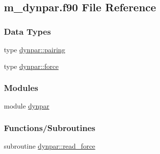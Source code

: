 \hypertarget{m__dynpar_8f90}{}\subsection{m\+\_\+dynpar.\+f90 File Reference}
\label{m__dynpar_8f90}
\subsubsection*{Data Types}
\begin{DoxyCompactItemize}
\item 
type \hyperlink{structdynpar_1_1pairing}{dynpar\+::pairing}
\item 
type \hyperlink{structdynpar_1_1force}{dynpar\+::force}
\end{DoxyCompactItemize}
\subsubsection*{Modules}
\begin{DoxyCompactItemize}
\item 
module \hyperlink{namespacedynpar}{dynpar}
\end{DoxyCompactItemize}
\subsubsection*{Functions/\+Subroutines}
\begin{DoxyCompactItemize}
\item 
subroutine \hyperlink{namespacedynpar_a55a0eb741c14d718ba58a4ee5c77ff2a}{dynpar\+::read\+\_\+force}
\end{DoxyCompactItemize}
